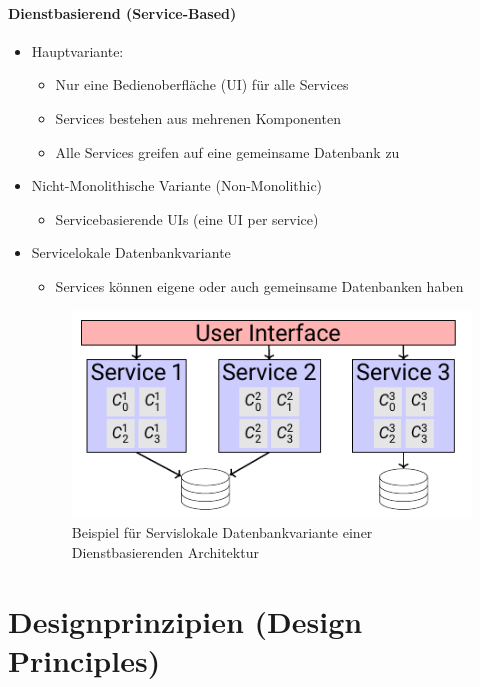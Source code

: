 \documentclass[
    ngerman,
    color=3b,
    summary,
    boxarc,
    main,
]{rubos-tuda-template}
\begin{document}
\paragraph{Dienstbasierend (Service-Based)}
\begin{itemize}
    \item Hauptvariante: \begin{itemize}
              \item Nur eine Bedienoberfläche (UI) für alle Services
              \item Services bestehen aus mehrenen Komponenten
              \item Alle Services greifen auf eine gemeinsame Datenbank zu
          \end{itemize}
    \item Nicht-Monolithische Variante (Non-Monolithic)\begin{itemize}
              \item Servicebasierende UIs (eine UI per service)
          \end{itemize}
    \item Servicelokale Datenbankvariante\begin{itemize}
              \item Services können eigene oder auch gemeinsame Datenbanken haben
          \end{itemize}
          \begin{figure}[ht]
              \centering
              \includegraphics{bilder/service_local_service_based_architecture_style.pdf}
              \caption{Beispiel für Servislokale Datenbankvariante einer Dienstbasierenden Architektur}
          \end{figure}
\end{itemize}

\clearpage
\section{Designprinzipien (Design Principles)}
\end{document}

